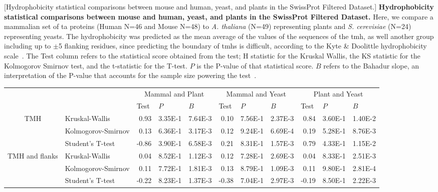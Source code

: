 \begin{table}[htbp]
\centering
{}[Hydrophobicity statistical comparisons between mouse and human, yeast, and plants in the SwissProt Filtered Dataset.]
{\textbf{Hydrophobicity statistical comparisons between mouse and human, yeast, and plants in the SwissProt Filtered Dataset.}
Here, we compare a mammalian set of \gls{ta} proteins (Human N=46 and Mouse N=48) to \textit{A. thaliana} (N=49) representing plants  and  \textit{S. cerevisiae} (N=24) representing yeasts.
The hydrophobicity was predicted as the mean average of the values of the sequences of the \gls{tmh}, as well another group including up to $\pm$5 flanking residues, since predicting the boundary of \gls{tmh}s is difficult, according to the Kyte \& Doolittle hydrophobicity scale~\cite{Kyte1982}.
The Test column refers to the statistical score obtained from the test; H statistic for the Kruskal Wallis, the KS statistic for the Kolmogorov Smirnov test, and the t-statistic for the T-test.
$P$ is the P-value of that statistical score.
$B$ refers to the Bahadur slope, an interpretation of the P-value that accounts for the sample size powering the test~\cite{Bahadur1967, Bahadur1971}.}
\tiny

    \begin{tabular}{clrrrrrrrrr}
          &       & \multicolumn{3}{c}{Mammal and Plant} & \multicolumn{3}{c}{Mammal and Yeast} & \multicolumn{3}{c}{Plant and Yeast} \\
          &       & \multicolumn{1}{l}{Test} & \multicolumn{1}{l}{$P$} & \multicolumn{1}{l}{$B$} & \multicolumn{1}{l}{Test} & \multicolumn{1}{l}{$P$} & \multicolumn{1}{l}{$B$} & \multicolumn{1}{l}{Test} & \multicolumn{1}{l}{$P$} & \multicolumn{1}{l}{$B$} \\
    \multirow{3}[0]{*}{TMH } &  Kruskal-Wallis & 0.93  & 3.35E-1 & 7.64E-3 & 0.10  & 7.56E-1 & 2.37E-3 & 0.84  & 3.60E-1 & 1.40E-2 \\
          &  Kolmogorov-Smirnov & 0.13  & 6.36E-1 & 3.17E-3 & 0.12  & 9.24E-1 & 6.69E-4 & 0.19  & 5.28E-1 & 8.76E-3 \\
          &  Student's T-test & -0.86 & 3.90E-1 & 6.58E-3 & 0.21  & 8.31E-1 & 1.57E-3 & 0.79  & 4.33E-1 & 1.15E-2 \\
    \multirow{3}[0]{*}{TMH and flanks } &  Kruskal-Wallis & 0.04  & 8.52E-1 & 1.12E-3 & 0.12  & 7.28E-1 & 2.69E-3 & 0.04  & 8.33E-1 & 2.51E-3 \\
          &  Kolmogorov-Smirnov & 0.11  & 7.72E-1 & 1.81E-3 & 0.13  & 8.79E-1 & 1.09E-3 & 0.11  & 9.80E-1 & 2.81E-4 \\
          &  Student's T-test & -0.22 & 8.23E-1 & 1.37E-3 & -0.38 & 7.04E-1 & 2.97E-3 & -0.19 & 8.50E-1 & 2.22E-3 \\
    \end{tabular}%
				\label{table:speciestableswissprotstats}

\end{table}%

